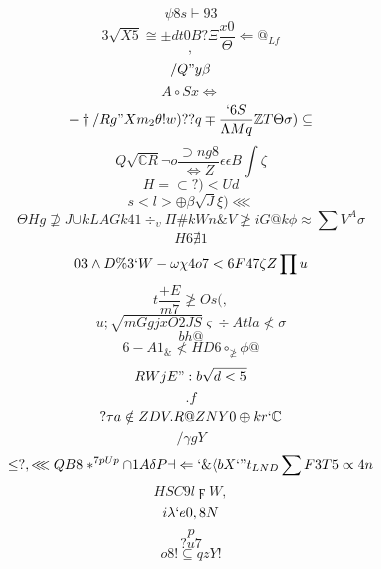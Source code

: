 \documentclass[12pt]{article}
\begin{document}
        \begin{minipage}[t][0pt]{\linewidth}

        \[\psi 8 s\vdash 9 3\]
\[3\sqrt{X5}\cong\pm d t 0 B ?\Xi\frac{x0}{\Theta}\Longleftarrow @_{Lf}\]
\[,\]
\[/Q"y\beta\]
\[A\circ S x\iff\]
\[-\dagger / R g " X m_{2}\theta ! w ) ? ? q\mp\frac{`6S}{\Lambda M q}\mathbb{Z} T\Theta\sigma )\subseteq\]
\[Q\sqrt{\mathbb{C} R}\neg o\frac{\supset n g 8}{\iff Z}\epsilon\epsilon B\int\zeta\]
\[H=\subset ? ) < U d\]
\[s<l>\oplus\beta\sqrt{J}\xi )\lll\]
\[\Theta H g\nsupseteq J {\cup k L A G k 4 1}\div_{\upsilon}\Pi\# k W n\& V\ngeq i {G@k}\phi\approx\sum V^{A}\sigma\]
\[H6\nexists 1\]
\[0 {3}\land D\% 3 ` W -\omega\chi 4 o 7 < 6 F 4 7\zeta Z\prod u\]
\[t\frac{+E}{m7}\ngeq O s ( ,\]
\[u;\sqrt{mGgjxO2JS}\varsigma\div A t l a\nless\sigma\]
\[bh@\]
\[6-A1_{\&}\nless H D 6\circ_{\ngeq}\phi @\]
\[RWjE":b\sqrt{d<5}\]
\[.f\]
\[?\tau a\notin Z D V . R @ Z N Y 0\oplus k r `\mathbb{C}\]
\[/\gamma g Y\]
\[\leq ? ,\lll Q B 8 *^{7pUp}\cap 1 A\delta P {\dashv}\Leftarrow `\&\langle b X ` " t_{LND}\sum F 3 T 5\propto 4 n\]
\[HSC9l\digamma W ,\]
\[i\lambda ` e 0 , 8 N\]
\[p\]
\[?u7\]
\[o8!\subseteq q z Y !
        \]
\end{minipage}
\end{document}
